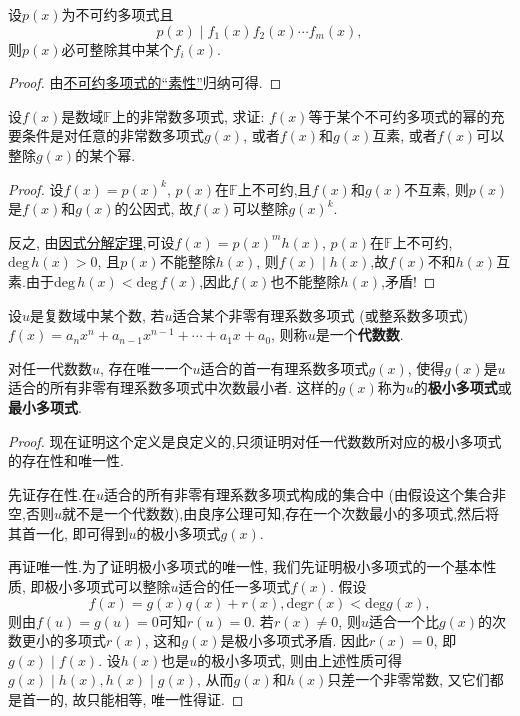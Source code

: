 \documentclass[lang=cn,newtx,10pt,scheme=chinese]{elegantbook}
\begin{document}
\begin{corollary}\label{corollary:不可约多项式“素性”的推论}
设\(p(x)\)为不可约多项式且
\[
p(x)\mid f_1(x)f_2(x)\cdots f_m(x),
\]
则\(p(x)\)必可整除其中某个\(f_i(x)\).
\end{corollary}
\begin{proof}
由\hyperref[theorem:不可约多项式的“素性”]{不可约多项式的“素性”}归纳可得.
\end{proof}

\begin{proposition}\label{proposition:多项式可以写成不可约多项式的幂的充要条件}
设\(f(x)\)是数域\(\mathbb{F}\)上的非常数多项式, 求证: \(f(x)\)等于某个不可约多项式的幂的充要条件是对任意的非常数多项式\(g(x)\), 或者\(f(x)\)和\(g(x)\)互素, 或者\(f(x)\)可以整除\(g(x)\)的某个幂.
\end{proposition}
\begin{proof}
设\(f(x)=p(x)^k\), \(p(x)\)在\(\mathbb{F}\)上不可约,且\(f(x)\)和\(g(x)\)不互素, 则\(p(x)\)是\(f(x)\)和\(g(x)\)的公因式, 故\(f(x)\)可以整除\(g(x)^k\).

反之, 由\hyperref[theorem:因式分解定理]{因式分解定理},可设\(f(x)=p(x)^mh(x)\), \(p(x)\)在\(\mathbb{F}\)上不可约, \(\mathrm{deg }\,h(x)>0\), 且\(p(x)\)不能整除\(h(x)\), 则\(f(x)\mid h(x)\),故$f(x)$不和$h(x)$互素.由于$\mathrm{deg}\,h(x)<\mathrm{deg }\,f(x)$,因此$f(x)$也不能整除\(h(x)\),矛盾!
\end{proof}

\begin{definition}[代数数]\label{definition:代数数}
设\(u\)是复数域中某个数, 若\(u\)适合某个非零有理系数多项式 (或整系数多项式)\(f(x)=a_nx^n + a_{n - 1}x^{n - 1}+\cdots+a_1x + a_0\), 则称\(u\)是一个\textbf{代数数}.
\end{definition}

\begin{definition}\label{definition:极小多项式(最小多项式)}
对任一代数数\(u\), 存在唯一一个\(u\)适合的首一有理系数多项式\(g(x)\), 使得\(g(x)\)是\(u\)适合的所有非零有理系数多项式中次数最小者. 这样的\(g(x)\)称为\(u\)的\textbf{极小多项式}或\textbf{最小多项式}.
\end{definition}
\begin{proof}
现在证明这个定义是良定义的,只须证明对任一代数数所对应的极小多项式的存在性和唯一性.

先证存在性.在\(u\)适合的所有非零有理系数多项式构成的集合中 (由假设这个集合非空,否则$u$就不是一个代数数),由良序公理可知,存在一个次数最小的多项式,然后将其首一化, 即可得到\(u\)的极小多项式\(g(x)\). 

再证唯一性.为了证明极小多项式的唯一性, 我们先证明极小多项式的一个基本性质, 即极小多项式可以整除\(u\)适合的任一多项式\(f(x)\). 假设
\[
f(x)=g(x)q(x)+r(x), \mathrm{deg }r(x)<\mathrm{deg }g(x),
\]
则由\(f(u)=g(u)=0\)可知\(r(u)=0\). 若\(r(x)\neq 0\), 则\(u\)适合一个比\(g(x)\)的次数更小的多项式\(r(x)\), 这和\(g(x)\)是极小多项式矛盾. 因此\(r(x)=0\), 即\(g(x)\mid f(x)\). 设\(h(x)\)也是\(u\)的极小多项式, 则由上述性质可得\(g(x)\mid h(x), h(x)\mid g(x)\), 从而\(g(x)\)和\(h(x)\)只差一个非零常数, 又它们都是首一的, 故只能相等, 唯一性得证.
\end{proof}
\end{document}
